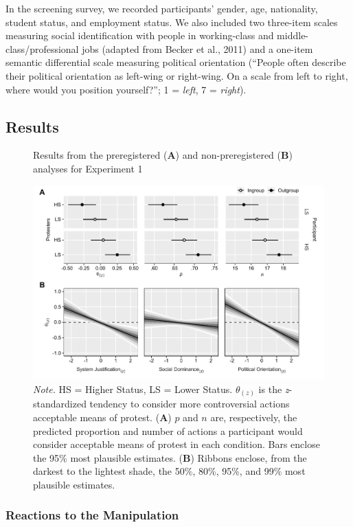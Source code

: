 \documentclass[twocolumn, 11pt, letterpaper]{article}
\begin{document}
In the screening survey, we recorded participants' gender, age,
nationality, student status, and employment status. We also included two
three-item scales measuring social identification with people in
working-class and middle-class/professional jobs (adapted from Becker et
al., 2011) and a one-item semantic differential scale measuring
political orientation (``People often describe their political
orientation as left-wing or right-wing. On a scale from left to right,
where would you position yourself?''; 1 = \emph{left}, 7 =
\emph{right}).

\hypertarget{results}{%
\subsection{Results}\label{results}}

\begin{figure}[!t]
\centering
\caption{Results from the preregistered (\textbf{A}) and non-preregistered (\textbf{B}) analyses for Experiment 1}
\includegraphics[scale=1]{../Experiment 1/figures/figure-3}
\caption*{\textit{Note.} HS = Higher Status, LS = Lower Status. $\theta_{(z)}$ is the \textit{z}-standardized tendency to consider more controversial actions acceptable means of protest. (\textbf{A}) $p$ and $n$ are, respectively, the predicted proportion and number of actions a participant would consider acceptable means of protest in each condition. Bars enclose the 95\% most plausible estimates. (\textbf{B}) Ribbons enclose, from the darkest to the lightest shade, the 50\%, 80\%, 95\%, and 99\% most plausible estimates.}
\label{fig:f3}
\end{figure}

\hypertarget{reactions-to-the-manipulation}{%
\subsubsection{Reactions to the
Manipulation}\label{reactions-to-the-manipulation}}
\end{document}
